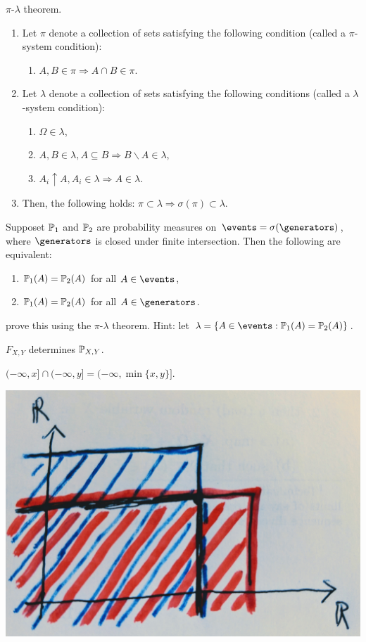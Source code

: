 \documentclass{article}
\begin{document}
 $\pi$-$\lambda$ theorem. 
\begin{enumerate}
\item Let $\pi$ denote a collection of sets satisfying the following condition (called a $\pi$-system condition):
\begin{enumerate}
  \item $A, B \in \pi \Longrightarrow A\cap B\in \pi$.
\end{enumerate}
\item Let $\lambda$ denote a collection of sets satisfying the following conditions (called a $\lambda$-system condition):
\begin{enumerate}
  \item $\Omega \in \lambda$,
  \item $A, B \in \lambda, A \subseteq B \Longrightarrow B \backslash A \in \lambda$,
  \item $A_i \uparrow A, A_i \in \lambda \Longrightarrow A \in \lambda.$
\end{enumerate}
\item Then, the following holds: $\pi \subset \lambda \Longrightarrow \sigma(\pi) \subset \lambda$.
\end{enumerate}

 Supposet $\P_1$ and $\P_2$ are probability measures on $\events = \sigma(\generators)$, where $\generators$ is closed under finite intersection. Then the following are equivalent:
\begin{enumerate}
  \item $\P_1(A) = \P_2(A)$ for all $A \in \events$,
  \item $\P_1(A) = \P_2(A)$ for all $A \in \generators$.
\end{enumerate}

 prove this using the $\pi$-$\lambda$ theorem. Hint: let $\lambda = \{A \in \events : \P_1(A) = \P_2(A)\}$.

 $F_{X,Y}$ determines $\P_{X,Y}$.

 $(-\infty, x] \cap (-\infty, y] = (-\infty, \min\{x, y\}]$.
\begin{center}
	\includegraphics[width=0.5\linewidth]{figures/intersection}
\end{center}
\end{document}
